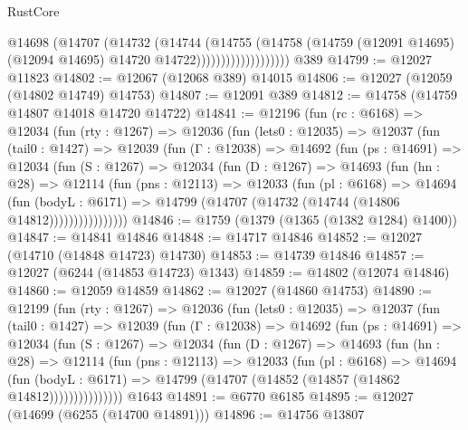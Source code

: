 \begin{lexlean}{RustCore}
\begin{coremodule}
                            @14698
                              (@14707
                                (@14732
                                  (@14744
                                    (@14755
                                      (@14758
                                        (@14759
                                          (@12091 @14695)
                                          (@12094 @14695)
                                          @14720
                                          @14722)))))))))))))))))))
    @389
@14799 := @12027 @11823
@14802 := @12067 (@12068 @389) @14015
@14806 := @12027 (@12059 (@14802 @14749) @14753)
@14807 := @12091 @389
@14812 := @14758 (@14759 @14807 @14018 @14720 @14722)
@14841 := @12196
    (fun (rc : @6168) =>
    @12034
      (fun (rty : @1267) =>
      @12036
        (fun (lets0 : @12035) =>
        @12037
          (fun (tail0 : @1427) =>
          @12039
            (fun (Γ : @12038) =>
            @14692
              (fun (ps : @14691) =>
              @12034
                (fun (S : @1267) =>
                @12034
                  (fun (D : @1267) =>
                  @14693
                    (fun (hn : @28) =>
                    @12114
                      (fun (pns : @12113) =>
                      @12033
                        (fun (pl : @6168) =>
                        @14694
                          (fun (bodyL : @6171) =>
                          @14799 (@14707 (@14732 (@14744 (@14806 @14812))))))))))))))))
@14846 := @1759 (@1379 (@1365 (@1382 @1284) @1400))
@14847 := @14841 @14846
@14848 := @14717 @14846
@14852 := @12027 (@14710 (@14848 @14723) @14730)
@14853 := @14739 @14846
@14857 := @12027 (@6244 (@14853 @14723) @1343)
@14859 := @14802 (@12074 @14846)
@14860 := @12059 @14859
@14862 := @12027 (@14860 @14753)
@14890 := @12199
    (fun (rty : @1267) =>
    @12036
      (fun (lets0 : @12035) =>
      @12037
        (fun (tail0 : @1427) =>
        @12039
          (fun (Γ : @12038) =>
          @14692
            (fun (ps : @14691) =>
            @12034
              (fun (S : @1267) =>
              @12034
                (fun (D : @1267) =>
                @14693
                  (fun (hn : @28) =>
                  @12114
                    (fun (pns : @12113) =>
                    @12033
                      (fun (pl : @6168) =>
                      @14694
                        (fun (bodyL : @6171) =>
                        @14799 (@14707 (@14852 (@14857 (@14862 @14812)))))))))))))))
    @1643
@14891 := @6770 @6185
@14895 := @12027 (@14699 (@6255 (@14700 @14891)))
@14896 := @14756 @13807

\end{coremodule}
\end{lexlean}
